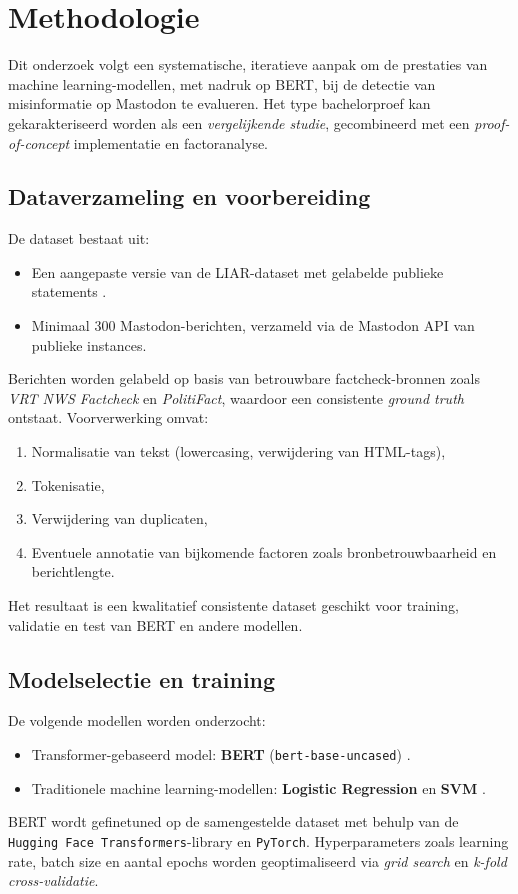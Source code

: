 \section{Methodologie}
\label{sec:methodologie}

Dit onderzoek volgt een systematische, iteratieve aanpak om de prestaties van machine learning-modellen,
met nadruk op BERT, bij de detectie van misinformatie op Mastodon te evalueren.
Het type bachelorproef kan gekarakteriseerd worden als een \emph{vergelijkende studie},
gecombineerd met een \emph{proof-of-concept} implementatie en factoranalyse.

\subsection{Dataverzameling en voorbereiding}
De dataset bestaat uit:
\begin{itemize}
    \item Een aangepaste versie van de LIAR-dataset met gelabelde publieke statements \autocite{LIAR2016}.
    \item Minimaal 300 Mastodon-berichten, verzameld via de Mastodon API van publieke instances.
\end{itemize}
Berichten worden gelabeld op basis van betrouwbare factcheck-bronnen zoals \textit{VRT NWS Factcheck} en \textit{PolitiFact},
waardoor een consistente \emph{ground truth} ontstaat.  
Voorverwerking omvat:
\begin{enumerate}[leftmargin=*]
    \item Normalisatie van tekst (lowercasing, verwijdering van HTML-tags),
    \item Tokenisatie,
    \item Verwijdering van duplicaten,
    \item Eventuele annotatie van bijkomende factoren zoals bronbetrouwbaarheid en berichtlengte.
\end{enumerate}
Het resultaat is een kwalitatief consistente dataset geschikt voor training, validatie en test van BERT en andere modellen.

\subsection{Modelselectie en training}
De volgende modellen worden onderzocht:
\begin{itemize}
    \item Transformer-gebaseerd model: \textbf{BERT} (\texttt{bert-base-uncased}) \autocite{Devlin2019}.
    \item Traditionele machine learning-modellen: \textbf{Logistic Regression} en \textbf{SVM} \autocite{Shu2017}.
\end{itemize}
BERT wordt gefinetuned op de samengestelde dataset met behulp van de \texttt{Hugging Face Transformers}-library en \texttt{PyTorch}.  
Hyperparameters zoals learning rate, batch size en aantal epochs worden geoptimaliseerd via \emph{grid search} en \emph{k-fold cross-validatie}.

